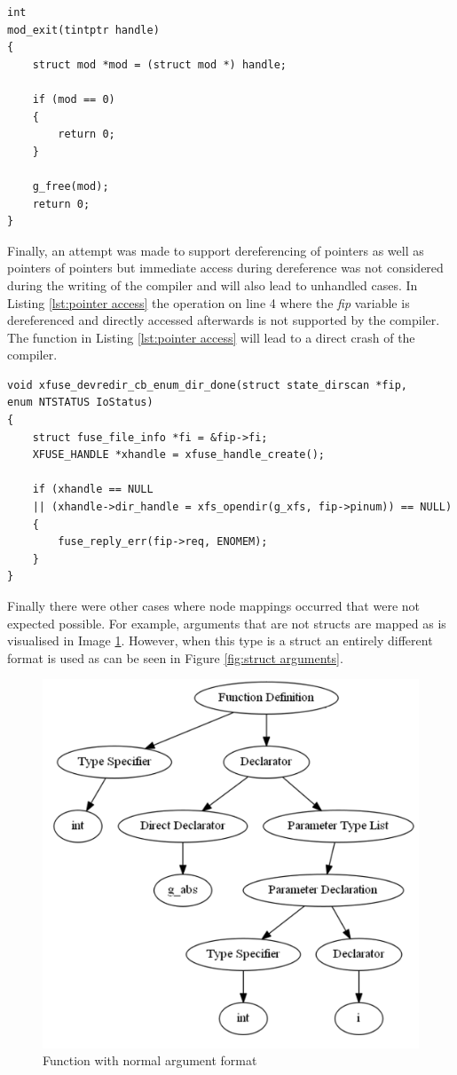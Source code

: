 \documentclass[12pt]{article}
\begin{document}
\begin{lstlisting}[style=CStyle, caption={Example of comparisons not considered by the compiler}, label={lst:not considered condition}]
int
mod_exit(tintptr handle)
{
	struct mod *mod = (struct mod *) handle;
	
	if (mod == 0)
	{
		return 0;
	}
	
	g_free(mod);
	return 0;
}
\end{lstlisting}

Finally, an attempt was made to support dereferencing of pointers as well as pointers of pointers but immediate access during dereference was not considered during the writing of the compiler and will also lead to unhandled cases. In Listing \ref{lst:pointer access} the operation on line 4 where the \textit{fip} variable is dereferenced and directly accessed afterwards is not supported by the compiler. The function in Listing \ref{lst:pointer access} will lead to a direct crash of the compiler.

\begin{lstlisting}[style=CStyle, caption={Example of unsupported access to pointer values}, label={lst:pointer access}]
void xfuse_devredir_cb_enum_dir_done(struct state_dirscan *fip,
enum NTSTATUS IoStatus)
{
	struct fuse_file_info *fi = &fip->fi;
	XFUSE_HANDLE *xhandle = xfuse_handle_create();
	
	if (xhandle == NULL
	|| (xhandle->dir_handle = xfs_opendir(g_xfs, fip->pinum)) == NULL)
	{
		fuse_reply_err(fip->req, ENOMEM);
	}
}
\end{lstlisting}

Finally there were other cases where node mappings occurred that were not expected possible. For example, arguments that are not structs are mapped as is visualised in Image \ref{fig:normal arguments}. However, when this type is a struct an entirely different format is used as can be seen in Figure \ref{fig:struct arguments}.

\begin{figure}[h]
	\centering
	\includegraphics[width=0.4\linewidth]{images/normal_function_param.png}
	\caption{Function with normal argument format}
	\label{fig:normal arguments}
\end{figure}
\end{document}
